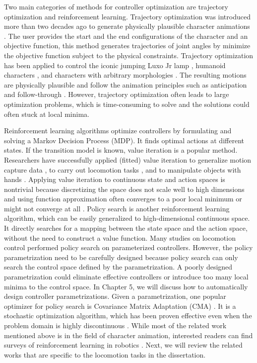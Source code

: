 Two main categories of methods for controller optimization are trajectory optimization and reinforcement learning. Trajectory optimization was introduced more than two decades ago to generate physically plausible character animations \cite{Witkin:1988}. The user provides the start and the end configurations of the character and an objective function, this method generates trajectories of joint angles by minimize the objective function subject to the physical constraints. Trajectory optimization has been applied to control the iconic jumping Luxo Jr lamp \cite{Witkin:1988}, humanoid characters \cite{Liu:2002,Jain:2009,Ye:2010}, and characters with arbitrary morphologies \cite{Wampler:2009}. The resulting motions are physically plausible and follow the animation principles such as anticipation and follow-through \cite{thomas:1995}. However, trajectory optimization often leads to large optimization problems, which is time-consuming to solve and the solutions could often stuck at local minima.

Reinforcement learning algorithms optimize controllers by formulating and solving a Markov Decision Process (MDP). It finds optimal actions at different states. If the transition model is known, value iteration is a popular method. Researchers have successfully applied (fitted) value iteration to generalize motion capture data \cite{Treuille:2007:NCA,Levine:2012:CCC}, to carry out locomotion tasks \cite{Coros:2009:RTC}, and to manipulate objects with hands \cite{Multifinger2013}. Applying value iteration to continuous state and action spaces is nontrivial because discretizing the space does not scale well to high dimensions \cite{Sutton:1998:IRL} and using function approximation often converges to a poor local minimum or might not converge at all \cite{Thrun93issuesin,Boyan95generalizationin}. Policy search \cite{Ng:2000:PPS} is another reinforcement learning algorithm, which can be easily generalized to high-dimensional continuous space. It directly searches for a mapping between the state space and the action space, without the need to construct a value function. Many studies on locomotion control \cite{Yin08,Wang:2009,Coros:2011,Wang:2012,Geijtenbeek:2013} performed policy search on parameterized controllers. However, the policy parametrization need to be carefully designed because policy search can only search the control space defined by the parametrization. A poorly designed parametrization could eliminate effective controllers or introduce too many local minima to the control space. In Chapter 5, we will discuss how to automatically design controller parametrizations. Given a parametrization, one popular optimizer for policy search is Covariance Matrix Adaptation (CMA) \cite{hansen2004evaluating}. It is a stochastic optimization algorithm, which has been proven effective even when the problem domain is highly discontinuous \cite{Wu:2010:TAB,Wang:2010,Mordatch:2010:RPL}. While most of the related work mentioned above is in the field of character animation, interested readers can find surveys of reinforcement learning in robotics \cite{Bagnell:2013}. Next, we will review the related works that are specific to the locomotion tasks in the dissertation.

